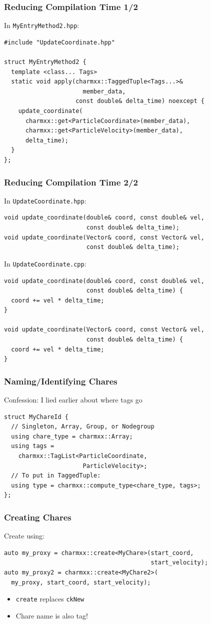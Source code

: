 \documentclass[svgnames,tikz,serif,ragged2e]{beamer}
\begin{document}
\begin{frame}[fragile]
  \frametitle{Reducing Compilation Time 1/2}
  In \texttt{MyEntryMethod2.hpp}:
\begin{lstlisting}
#include "UpdateCoordinate.hpp"

struct MyEntryMethod2 {
  template <class... Tags>
  static void apply(charmxx::TaggedTuple<Tags...>&
                      member_data,
                    const double& delta_time) noexcept {
    update_coordinate(
      charmxx::get<ParticleCoordinate>(member_data),
      charmxx::get<ParticleVelocity>(member_data),
      delta_time);
  }
};
\end{lstlisting}
\end{frame}

\begin{frame}[fragile]
  \frametitle{Reducing Compilation Time 2/2}
    In \texttt{UpdateCoordinate.hpp}:
\begin{lstlisting}
void update_coordinate(double& coord, const double& vel,
                       const double& delta_time);
void update_coordinate(Vector& coord, const Vector& vel,
                       const double& delta_time);
\end{lstlisting}
  In \texttt{UpdateCoordinate.cpp}:
\begin{lstlisting}
void update_coordinate(double& coord, const double& vel,
                       const double& delta_time) {
  coord += vel * delta_time;
}

void update_coordinate(Vector& coord, const Vector& vel,
                       const double& delta_time) {
  coord += vel * delta_time;
}
\end{lstlisting}
\end{frame}

\begin{frame}
  \frametitle{Naming/Identifying Chares}
  Confession: I lied earlier about where tags go
\begin{lstlisting}
struct MyChareId {
  // Singleton, Array, Group, or Nodegroup
  using chare_type = charmxx::Array;
  using tags =
    charmxx::TagList<ParticleCoordinate,
                      ParticleVelocity>;
  // To put in TaggedTuple:
  using type = charmxx::compute_type<chare_type, tags>;
};
\end{lstlisting}
\end{frame}

\begin{frame}
  \frametitle{Creating Chares}
  Create using:
\begin{lstlisting}
auto my_proxy = charmxx::create<MyChare>(start_coord,
                                         start_velocity);
auto my_proxy2 = charmxx::create<MyChare2>(
  my_proxy, start_coord, start_velocity);
\end{lstlisting}
  \begin{itemize}
  \item \texttt{create} replaces \texttt{ckNew}
  \item Chare name is also tag!
  \end{itemize}
\end{frame}
\end{document}
